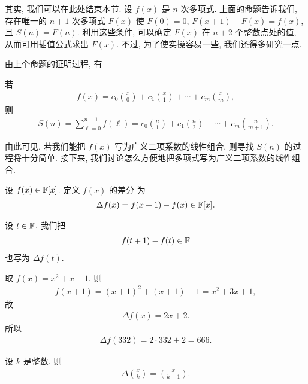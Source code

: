 其实, 我们可以在此处结束本节. 设 $f(x)$ 是 $n$ 次多项式. 上面的命题告诉我们, 存在唯一的 $n+1$ 次多项式 $F(x)$ 使 $F(0) = 0$, $F(x + 1) - F(x) = f(x)$, 且 $S(n) = F(n)$. 利用这些条件, 可以确定 $F(x)$ 在 $n+2$ 个整数点处的值, 从而可用插值公式求出 $F(x)$. 不过, 为了使实操容易一些, 我们还得多研究一点.

由上个命题的证明过程, 有

\begin{proposition}
    若
    \begin{align*}
        f(x) = c_0 \binom{x}{0} + c_1 \binom{x}{1} + \cdots + c_m \binom{x}{m},
    \end{align*}
    则
    \begin{align*}
        S(n) = \sum_{\ell = 0}^{n - 1} f(\ell) = c_0 \binom{n}{1} + c_1 \binom{n}{2} + \cdots + c_m \binom{n}{m + 1}.
    \end{align*}
\end{proposition}

由此可见, 若我们能把 $f(x)$ 写为广义二项系数的线性组合, 则寻找 $S(n)$ 的过程将十分简单. 接下来, 我们讨论怎么方便地把多项式写为广义二项系数的线性组合.

\begin{definition}
    设 $f(x) \in \mathbb{F}[x]$. 定义 $f(x)$ 的差分  为
    \begin{align*}
        \Delta f(x) = f(x+1) - f(x) \in \mathbb{F}[x].
    \end{align*}

    设 $t \in \mathbb{F}$. 我们把
    \begin{align*}
        f(t+1) - f(t) \in \mathbb{F}
    \end{align*}
    也写为 $\Delta f(t)$.
\end{definition}

\begin{example}
    取 $f(x) = x^2 + x - 1$. 则
    \begin{align*}
        f(x + 1) = (x + 1)^2 + (x + 1) - 1 = x^2 + 3x + 1,
    \end{align*}
    故
    \begin{align*}
        \Delta f(x) = 2x + 2.
    \end{align*}
    所以
    \begin{align*}
        \Delta f(332) = 2 \cdot 332 + 2 = 666.
    \end{align*}
\end{example}

\begin{proposition}
    设 $k$ 是整数. 则
    \begin{align*}
        \Delta \binom{x}{k} = \binom{x}{k - 1}.
    \end{align*}
\end{proposition}

